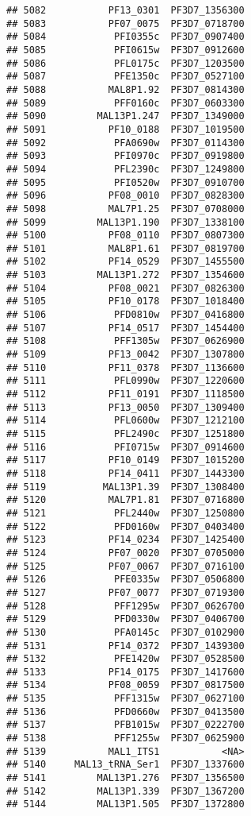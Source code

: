 \documentclass{article}\usepackage[]{graphicx}\usepackage[]{color}
\makeatletter
\newenvironment{kframe}{%
 \def\at@end@of@kframe{}%
 \ifinner\ifhmode%
  \def\at@end@of@kframe{\end{minipage}}%
  \begin{minipage}{\columnwidth}%
 \fi\fi%
 \def\FrameCommand##1{\hskip\@totalleftmargin \hskip-\fboxsep
 \colorbox{shadecolor}{##1}\hskip-\fboxsep
     \hskip-\linewidth \hskip-\@totalleftmargin \hskip\columnwidth}%
 \MakeFramed {\advance\hsize-\width
   \@totalleftmargin\z@ \linewidth\hsize
   \@setminipage}}%
 {\par\unskip\endMakeFramed%
 \at@end@of@kframe}
\newenvironment{knitrout}{}{} %
\makeatother
\begin{document}
\begin{knitrout}
\begin{kframe}
\begin{verbatim}
## 5082           PF13_0301  PF3D7_1356300
## 5083           PF07_0075  PF3D7_0718700
## 5084            PFI0355c  PF3D7_0907400
## 5085            PFI0615w  PF3D7_0912600
## 5086            PFL0175c  PF3D7_1203500
## 5087            PFE1350c  PF3D7_0527100
## 5088           MAL8P1.92  PF3D7_0814300
## 5089            PFF0160c  PF3D7_0603300
## 5090         MAL13P1.247  PF3D7_1349000
## 5091           PF10_0188  PF3D7_1019500
## 5092            PFA0690w  PF3D7_0114300
## 5093            PFI0970c  PF3D7_0919800
## 5094            PFL2390c  PF3D7_1249800
## 5095            PFI0520w  PF3D7_0910700
## 5096           PF08_0010  PF3D7_0828300
## 5098           MAL7P1.25  PF3D7_0708000
## 5099         MAL13P1.190  PF3D7_1338100
## 5100           PF08_0110  PF3D7_0807300
## 5101           MAL8P1.61  PF3D7_0819700
## 5102           PF14_0529  PF3D7_1455500
## 5103         MAL13P1.272  PF3D7_1354600
## 5104           PF08_0021  PF3D7_0826300
## 5105           PF10_0178  PF3D7_1018400
## 5106            PFD0810w  PF3D7_0416800
## 5107           PF14_0517  PF3D7_1454400
## 5108            PFF1305w  PF3D7_0626900
## 5109           PF13_0042  PF3D7_1307800
## 5110           PF11_0378  PF3D7_1136600
## 5111            PFL0990w  PF3D7_1220600
## 5112           PF11_0191  PF3D7_1118500
## 5113           PF13_0050  PF3D7_1309400
## 5114            PFL0600w  PF3D7_1212100
## 5115            PFL2490c  PF3D7_1251800
## 5116            PFI0715w  PF3D7_0914600
## 5117           PF10_0149  PF3D7_1015200
## 5118           PF14_0411  PF3D7_1443300
## 5119          MAL13P1.39  PF3D7_1308400
## 5120           MAL7P1.81  PF3D7_0716800
## 5121            PFL2440w  PF3D7_1250800
## 5122            PFD0160w  PF3D7_0403400
## 5123           PF14_0234  PF3D7_1425400
## 5124           PF07_0020  PF3D7_0705000
## 5125           PF07_0067  PF3D7_0716100
## 5126            PFE0335w  PF3D7_0506800
## 5127           PF07_0077  PF3D7_0719300
## 5128            PFF1295w  PF3D7_0626700
## 5129            PFD0330w  PF3D7_0406700
## 5130            PFA0145c  PF3D7_0102900
## 5131           PF14_0372  PF3D7_1439300
## 5132            PFE1420w  PF3D7_0528500
## 5133           PF14_0175  PF3D7_1417600
## 5134           PF08_0059  PF3D7_0817500
## 5135            PFF1315w  PF3D7_0627100
## 5136            PFD0660w  PF3D7_0413500
## 5137            PFB1015w  PF3D7_0222700
## 5138            PFF1255w  PF3D7_0625900
## 5139           MAL1_ITS1           <NA>
## 5140     MAL13_tRNA_Ser1  PF3D7_1337600
## 5141         MAL13P1.276  PF3D7_1356500
## 5142         MAL13P1.339  PF3D7_1367200
## 5144         MAL13P1.505  PF3D7_1372800

\end{verbatim}
\end{kframe}
\end{knitrout}
\end{document}
